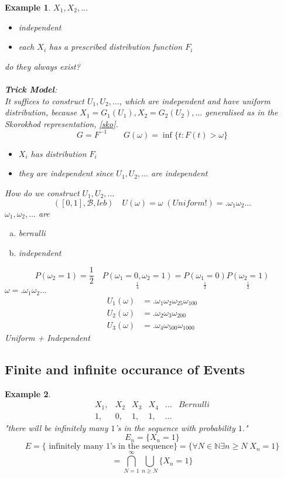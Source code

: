 \documentclass[12pt]{article}
\def\NN{\mathbb{N}}
\newtheorem{example}{Example}[section]
\begin{document}
\begin{example}
$X_1, X_2,\dots$ \begin{itemize}
\item independent
\item each $X_i$ has a prescribed distribution function $F_i$
\end{itemize}
do they always exist?\\\quad\\
\textbf{Trick Model}:\\
It suffices to construct $U_1, U_2, \dots$, which are independent and have uniform distribution, because $X_1 = G_1(U_1), X_2=G_2(U_2), \dots $ generalised as in the Skorokhod representation, \ref{sko}.
\[G=F^{-1} \qquad G(\omega) = \inf\{t:F(t)>\omega\} \]
\begin{itemize}
\item $X_i$ has distribution $F_i$
\item they are independent since $U_1, U_2, \dots$ are independent \end{itemize}
How do we construct $U_1, U_2, \dots$
\[([0,1] , \mathcal{B}, leb) \quad U(\omega)=\omega \; (Uniform!) = .\omega_1\omega_2\dots\]
$\omega_1,\omega_2,\dots$ are \begin{enumerate}[(a)]
\item bernulli
\item independent
\end{enumerate}
\[P(\omega_2 = 1) = \frac{1}{2}\quad \underset{\frac{1}{4}}{P(\omega_1 = 0, \omega_2= 1)} = \underset{\frac{1}{2}}{P(\omega_1 = 0)}\underset{\frac{1}{2}}{P( \omega_2= 1)}\]
$\omega= .\omega_1\omega_2\dots$
\begin{align*}
U_1(\omega) &= .\omega_1\omega_2\omega_{25}\omega_{100}\\
U_2(\omega) &= .\omega_2\omega_3\omega_{200}\\
U_3(\omega) &= .\omega_4\omega_{500}\omega_{1000}
\end{align*}
Uniform + Independent
\end{example}

\subsection{Finite and infinite occurance of Events}
\begin{example}
\[\begin{array}{cccccc}
X_1, &X_2 &X_3 &X_4 &\dots &Bernulli\\
1, &0, &1, &1, &\dots & \end{array}\]
"there will be infinitely many $1$'s in the sequence with probability $1$." \[E_n= \{X_n = 1\}\]
\[ E = \{\text{ infinitely many $1$'s in the sequence}\} = \{\forall N \in \NN \exists n \geq N \;X_n=1\}\]
\[ = \bigcap_{N=1}^{\infty}\bigcup_{n \geq N}\{X_n = 1\}\] \end{example}
\end{document}
